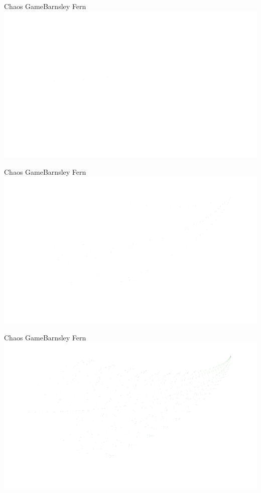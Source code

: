 \documentclass[usenames,dvipsnames,svgnames,10pt,aspectratio=169]{beamer}
\begin{document}
\begin{frame}[t, c]{Chaos Game}{Barnsley Fern}
	\centering
	\includegraphics[width=.8\textwidth]{Barnsley_fern_0}
	\vspace{1cm}
\end{frame}

\begin{frame}[t, c]{Chaos Game}{Barnsley Fern}
	\centering
	\includegraphics[width=.8\textwidth]{Barnsley_fern_1}
	\vspace{1cm}
\end{frame}

\begin{frame}[t, c]{Chaos Game}{Barnsley Fern}
	\centering
	\includegraphics[width=.8\textwidth]{Barnsley_fern_2}
	\vspace{1cm}
\end{frame}
\end{document}
